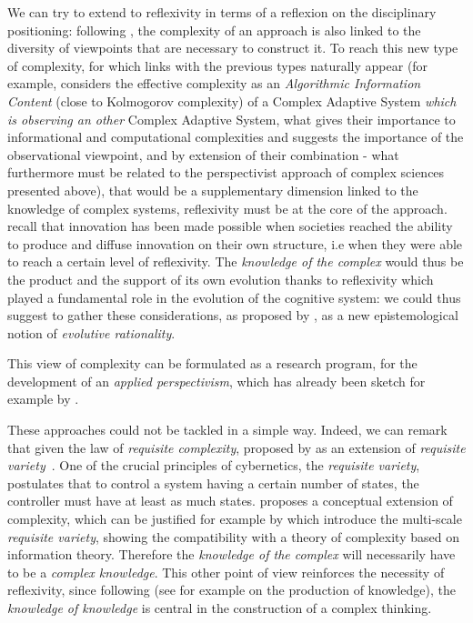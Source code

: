 We can try to extend to reflexivity in terms of a reflexion on the disciplinary positioning: following \cite{pumain2005cumulativite}, the complexity of an approach is also linked to the diversity of viewpoints that are necessary to construct it. To reach this new type of complexity, for which links with the previous types naturally appear (for example, \cite{gell1995quark} considers the effective complexity as an \emph{Algorithmic Information Content} (close to Kolmogorov complexity) of a Complex Adaptive System \emph{which is observing an other} Complex Adaptive System, what gives their importance to informational and computational complexities and suggests the importance of the observational viewpoint, and by extension of their combination - what furthermore must be related to the perspectivist approach of complex sciences presented above), that would be a supplementary dimension linked to the knowledge of complex systems, reflexivity must be at the core of the approach. \cite{read2009innovation} recall that innovation has been made possible when societies reached the ability to produce and diffuse innovation on their own structure, i.e when they were able to reach a certain level of reflexivity. The \emph{knowledge of the complex} would thus be the product and the support of its own evolution thanks to reflexivity which played a fundamental role in the evolution of the cognitive system: we could thus suggest to gather these considerations, as proposed by , as a new epistemological notion of \emph{evolutive rationality}.


This view of complexity can be formulated as a research program, for the development of an \emph{applied perspectivism}, which has already been sketch for example by \cite{2018arXiv180807282B}.


These approaches could not be tackled in a simple way. Indeed, we can remark that given the law of \emph{requisite complexity}, proposed by \cite{gershenson2015requisite} as an extension of \emph{requisite variety}~\cite{ashby1991requisite}. One of the crucial principles of cybernetics, the \emph{requisite variety}, postulates that to control a system having a certain number of states, the controller must have at least as much states.  proposes a conceptual extension of complexity, which can be justified for example by \cite{allen2017multiscale} which introduce the multi-scale \emph{requisite variety}, showing the compatibility with a theory of complexity based on information theory. Therefore the \emph{knowledge of the complex} will necessarily have to be a \emph{complex knowledge}. This other point of view reinforces the necessity of reflexivity, since following  (see for example \cite{morin1991methode} on the production of knowledge), the \emph{knowledge of knowledge} is central in the construction of a complex thinking.



